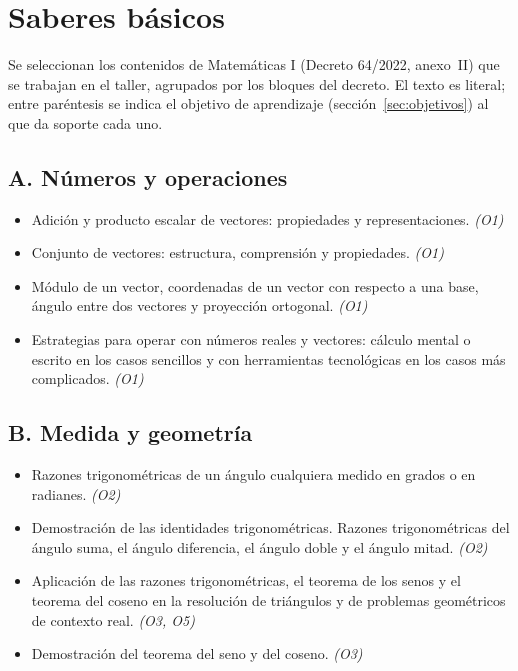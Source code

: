 \documentclass[11pt,a4paper]{article}
\begin{document}
\section{Saberes básicos}
Se seleccionan los contenidos de Matemáticas I (Decreto 64/2022, anexo~II)
que se trabajan en el taller, agrupados por los bloques del decreto. El texto
es literal; entre paréntesis se indica el objetivo de aprendizaje
(sección~\ref{sec:objetivos}) al que da soporte cada uno.

\subsection*{A. Números y operaciones}
\begin{itemize}
  \item Adición y producto escalar de vectores: propiedades y representaciones. {\color{gris}\emph{(O1)}}
  \item Conjunto de vectores: estructura, comprensión y propiedades. {\color{gris}\emph{(O1)}}
  \item Módulo de un vector, coordenadas de un vector con respecto a una base, ángulo entre dos vectores y proyección ortogonal. {\color{gris}\emph{(O1)}}
  \item Estrategias para operar con números reales y vectores: cálculo mental o escrito en los casos sencillos y con herramientas tecnológicas en los casos más complicados. {\color{gris}\emph{(O1)}}
\end{itemize}

\subsection*{B. Medida y geometría}
\begin{itemize}
  \item Razones trigonométricas de un ángulo cualquiera medido en grados o en radianes. {\color{gris}\emph{(O2)}}
  \item Demostración de las identidades trigonométricas. Razones trigonométricas del ángulo suma, el ángulo diferencia, el ángulo doble y el ángulo mitad. {\color{gris}\emph{(O2)}}
  \item Aplicación de las razones trigonométricas, el teorema de los senos y el teorema del coseno en la resolución de triángulos y de problemas geométricos de contexto real. {\color{gris}\emph{(O3, O5)}}
  \item Demostración del teorema del seno y del coseno. {\color{gris}\emph{(O3)}}
\end{itemize}
\end{document}

